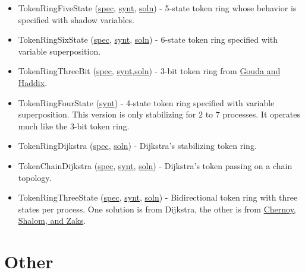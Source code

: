 \begin{itemize}
\item TokenRingFiveState (\href{examplespec/TokenRing.prot}{spec}, \href{examplesynt/TokenRing.prot}{synt}, \href{examplesoln/TokenRingFiveState.prot}{soln})
- 5-state token ring whose behavior is specified with shadow variables.
\item TokenRingSixState (\href{examplespec/TokenRingSuperpos.prot}{spec}, \href{examplesynt/TokenRingSuperpos.prot}{synt}, \href{examplesoln/TokenRingSixState.prot}{soln})
- 6-state token ring specified with variable superposition.
\item TokenRingThreeBit (\href{examplespec/TokenRingThreeBit.prot}{spec}, \href{examplesynt/TokenRingThreeBit.prot}{synt},\href{examplesoln/TokenRingThreeBit.prot}{soln})
- 3-bit token ring from \href{http://dx.doi.org/10.1006/jpdc.1996.0066}{Gouda and Haddix}.
\item TokenRingFourState (\href{examplesynt/TokenRingFourState.prot}{synt})
- 4-state token ring specified with variable superposition.
This version is only stabilizing for $2$ to $7$ processes.
It operates much like the 3-bit token ring.
\item TokenRingDijkstra (\href{examplespec/TokenRingDijkstra.prot}{spec}, \href{examplesoln/TokenRingDijkstra.prot}{soln})
- Dijkstra's stabilizing token ring.
\item TokenChainDijkstra (\href{examplespec/TokenChainDijkstra.prot}{spec}, \href{examplesynt/TokenChainDijkstra.prot}{synt}, \href{examplesoln/TokenChainDijkstra.prot}{soln})
- Dijkstra's token passing on a chain topology.
\item TokenRingThreeState (\href{examplespec/TokenRingThreeState.prot}{spec}, \href{examplesynt/TokenRingThreeState.prot}{synt}, \href{examplesoln/TokenRingThreeState.prot}{soln})
- Bidirectional token ring with three states per process.
One solution is from Dijkstra, the other is from \href{http://citeseerx.ist.psu.edu/viewdoc/summary?doi=10.1.1.153.6017}{Chernoy, Shalom, and Zaks}.
\end{itemize}


\section{Other}

